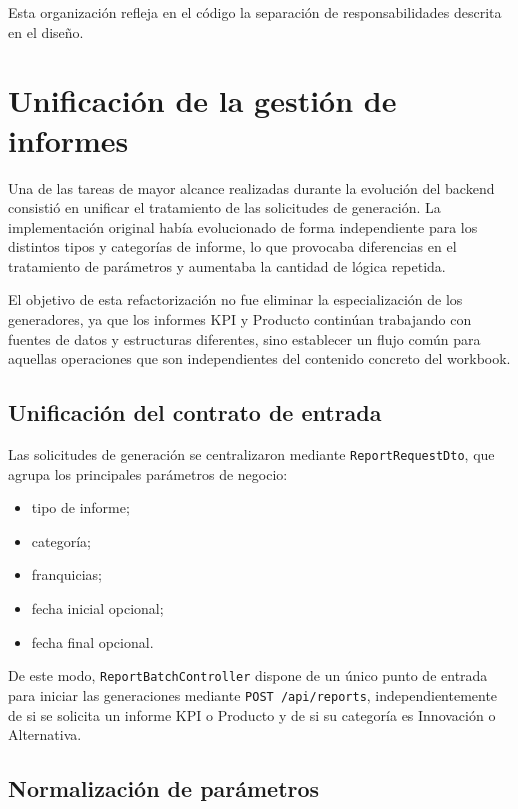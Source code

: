 \documentclass[11pt,a4paper,titlepage,oneside]{report}
\begin{document}
Esta organización refleja en el código la separación de responsabilidades
descrita en el diseño.

\section{Unificación de la gestión de informes}

Una de las tareas de mayor alcance realizadas durante la evolución del
backend consistió en unificar el tratamiento de las solicitudes de generación.
La implementación original había evolucionado de forma independiente para los
distintos tipos y categorías de informe, lo que provocaba diferencias en el
tratamiento de parámetros y aumentaba la cantidad de lógica repetida.

El objetivo de esta refactorización no fue eliminar la especialización de los
generadores, ya que los informes KPI y Producto continúan trabajando con
fuentes de datos y estructuras diferentes, sino establecer un flujo común
para aquellas operaciones que son independientes del contenido concreto del
workbook.

\subsection{Unificación del contrato de entrada}

Las solicitudes de generación se centralizaron mediante
\texttt{ReportRequestDto}, que agrupa los principales parámetros de negocio:

\begin{itemize}

  \item tipo de informe;
  \item categoría;
  \item franquicias;
  \item fecha inicial opcional;
  \item fecha final opcional.

\end{itemize}

De este modo, \texttt{ReportBatchController} dispone de un único punto de
entrada para iniciar las generaciones mediante \texttt{POST /api/reports},
independientemente de si se solicita un informe KPI o Producto y de si su
categoría es Innovación o Alternativa.

\subsection{Normalización de parámetros}
\end{document}
